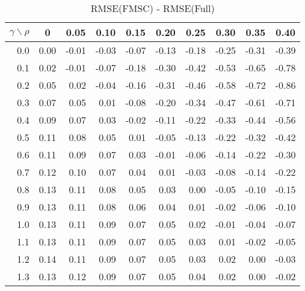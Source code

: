 \documentclass[12pt]{article}
\begin{document}
%
\begin{table}[!tbp]
\caption{RMSE(FMSC) - RMSE(Full)}
 \begin{center}
 \begin{tabular}{r|rrrrrrrrr}\hline\hline
\multicolumn{1}{c|}{$\gamma\backslash\rho$}&\multicolumn{1}{c}{0}&\multicolumn{1}{c}{0.05}&\multicolumn{1}{c}{0.10}&\multicolumn{1}{c}{0.15}&\multicolumn{1}{c}{0.20}&\multicolumn{1}{c}{0.25}&\multicolumn{1}{c}{0.30}&\multicolumn{1}{c}{0.35}&\multicolumn{1}{c}{0.40}\tabularnewline
\hline
0.0&0.00&-0.01&-0.03&-0.07&-0.13&-0.18&-0.25&-0.31&-0.39\tabularnewline
0.1&0.02&-0.01&-0.07&-0.18&-0.30&-0.42&-0.53&-0.65&-0.78\tabularnewline
0.2&0.05& 0.02&-0.04&-0.16&-0.31&-0.46&-0.58&-0.72&-0.86\tabularnewline
0.3&0.07& 0.05& 0.01&-0.08&-0.20&-0.34&-0.47&-0.61&-0.71\tabularnewline
0.4&0.09& 0.07& 0.03&-0.02&-0.11&-0.22&-0.33&-0.44&-0.56\tabularnewline
0.5&0.11& 0.08& 0.05& 0.01&-0.05&-0.13&-0.22&-0.32&-0.42\tabularnewline
0.6&0.11& 0.09& 0.07& 0.03&-0.01&-0.06&-0.14&-0.22&-0.30\tabularnewline
0.7&0.12& 0.10& 0.07& 0.04& 0.01&-0.03&-0.08&-0.14&-0.22\tabularnewline
0.8&0.13& 0.11& 0.08& 0.05& 0.03& 0.00&-0.05&-0.10&-0.15\tabularnewline
0.9&0.13& 0.11& 0.08& 0.06& 0.04& 0.01&-0.02&-0.06&-0.10\tabularnewline
1.0&0.13& 0.11& 0.09& 0.07& 0.05& 0.02&-0.01&-0.04&-0.07\tabularnewline
1.1&0.13& 0.11& 0.09& 0.07& 0.05& 0.03& 0.01&-0.02&-0.05\tabularnewline
1.2&0.14& 0.11& 0.09& 0.07& 0.05& 0.03& 0.02& 0.00&-0.03\tabularnewline
1.3&0.13& 0.12& 0.09& 0.07& 0.05& 0.04& 0.02& 0.00&-0.02\tabularnewline
\hline
\end{tabular}

\end{center}

\end{table}
\end{document}
